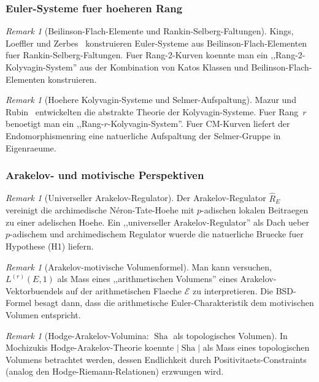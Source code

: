\documentclass[aps,prd,twocolumn,superscriptaddress,nofootinbib]{revtex4-2}
\theoremstyle{definition}
\theoremstyle{remark}
\newtheorem{remark}[theorem]{Remark}
\DeclareMathOperator{\Sha}{Sha}
\begin{document}
\subsubsection{Euler-Systeme fuer hoeheren Rang}

\begin{remark}[Beilinson-Flach-Elemente und Rankin-Selberg-Faltungen]
\label{rem:beilinson-flach}
Kings, Loeffler und Zerbes~\cite{KLZ2017} konstruieren Euler-Systeme aus Beilinson-Flach-Elementen fuer Rankin-Selberg-Faltungen. Fuer Rang-2-Kurven koennte man ein ,,Rang-2-Kolyvagin-System'' aus der Kombination von Katos Klassen und Beilinson-Flach-Elementen konstruieren.
\end{remark}

\begin{remark}[Hoehere Kolyvagin-Systeme und Selmer-Aufspaltung]
\label{rem:kolyvagin-higher}
Mazur und Rubin~\cite{MazurRubin2004} entwickelten die abstrakte Theorie der Kolyvagin-Systeme. Fuer Rang~$r$ benoetigt man ein ,,Rang-$r$-Kolyvagin-System''. Fuer CM-Kurven liefert der Endomorphismenring eine natuerliche Aufspaltung der Selmer-Gruppe in Eigenraeume.
\end{remark}

\subsubsection{Arakelov- und motivische Perspektiven}

\begin{remark}[Universeller Arakelov-Regulator]
\label{rem:arakelov-regulator}
Der Arakelov-Regulator $\hat{R}_E$ vereinigt die archimedische N\'eron-Tate-Hoehe mit $p$-adischen lokalen Beitraegen zu einer adelischen Hoehe. Ein ,,universeller Arakelov-Regulator'' als Dach ueber $p$-adischem und archimedischem Regulator wuerde die natuerliche Bruecke fuer Hypothese (H1) liefern.
\end{remark}

\begin{remark}[Arakelov-motivische Volumenformel]
\label{rem:arakelov-volume}
Man kann versuchen, $L^{(r)}(E,1)$ als Mass eines ,,arithmetischen Volumens'' eines Arakelov-Vektorbuendels auf der arithmetischen Flaeche $\mathcal{E}$ zu interpretieren. Die BSD-Formel besagt dann, dass die arithmetische Euler-Charakteristik dem motivischen Volumen entspricht.
\end{remark}

\begin{remark}[Hodge-Arakelov-Volumina: $\Sha$ als topologisches Volumen]
\label{rem:hodge-arakelov-sha}
In Mochizukis Hodge-Arakelov-Theorie koennte $|\Sha|$ als Mass eines topologischen Volumens betrachtet werden, dessen Endlichkeit durch Positivitaets-Constraints (analog den Hodge-Riemann-Relationen) erzwungen wird.
\end{remark}
\end{document}
